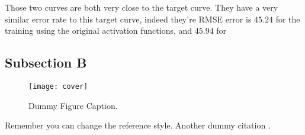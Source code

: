Those two curves are both very close to the target curve. They have a very similar error rate to this target curve, indeed they're \ac{RMSE} error is $45.24$ for the training using the original activation functions, and $45.94$ for

\subsection{Subsection B}
\label{subsec:subbsectiona}

\begin{figure}[H]
  \centering
  \texttt{[image: cover]}
  \caption[Dummy Figure Caption for List of Figures.]{Dummy Figure Caption.}
  \label{fig:dummyfigure1}
\end{figure}

Remember you can change the reference style. Another dummy citation \cite{site}.
